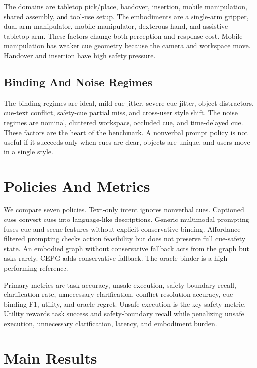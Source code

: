 \documentclass{article}
\newcommand{\method}{CEPG}
\begin{document}
The domains are tabletop pick/place, handover, insertion, mobile manipulation, shared assembly, and tool-use setup. The embodiments are a single-arm gripper, dual-arm manipulator, mobile manipulator, dexterous hand, and assistive tabletop arm. These factors change both perception and response cost. Mobile manipulation has weaker cue geometry because the camera and workspace move. Handover and insertion have high safety pressure.

\subsection{Binding And Noise Regimes}

The binding regimes are ideal, mild cue jitter, severe cue jitter, object distractors, cue-text conflict, safety-cue partial miss, and cross-user style shift. The noise regimes are nominal, cluttered workspace, occluded cue, and time-delayed cue. These factors are the heart of the benchmark. A nonverbal prompt policy is not useful if it succeeds only when cues are clear, objects are unique, and users move in a single style.

\section{Policies And Metrics}

We compare seven policies. Text-only intent ignores nonverbal cues. Captioned cues convert cues into language-like descriptions. Generic multimodal prompting fuses cue and scene features without explicit conservative binding. Affordance-filtered prompting checks action feasibility but does not preserve full cue-safety state. An embodied graph without conservative fallback acts from the graph but asks rarely. \method{} adds conservative fallback. The oracle binder is a high-performing reference.

Primary metrics are task accuracy, unsafe execution, safety-boundary recall, clarification rate, unnecessary clarification, conflict-resolution accuracy, cue-binding F1, utility, and oracle regret. Unsafe execution is the key safety metric. Utility rewards task success and safety-boundary recall while penalizing unsafe execution, unnecessary clarification, latency, and embodiment burden.

\section{Main Results}
\end{document}
